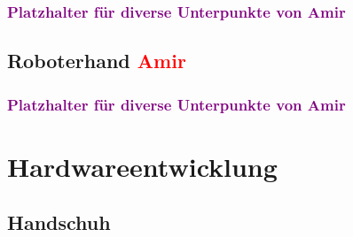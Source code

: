 \documentclass[11pt]{article}
\begin{document}
\subsubsection{\textcolor{purple}{Platzhalter für diverse Unterpunkte von Amir}}

\subsection{Roboterhand \textcolor{red}{Amir}}
\subsubsection{\textcolor{purple}{Platzhalter für diverse Unterpunkte von Amir}}


\section{Hardwareentwicklung}

\subsection{Handschuh}
\end{document}
